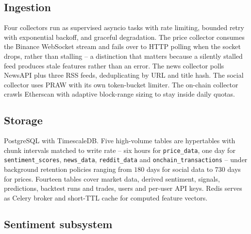 \documentclass[preprint,12pt,authoryear]{elsarticle}
\begin{document}
\subsection{Ingestion}

Four collectors run as supervised asyncio tasks with rate limiting, bounded
retry with exponential backoff, and graceful degradation. The price collector
consumes the Binance WebSocket stream and fails over to HTTP polling when the
socket drops, rather than stalling -- a distinction that matters because a
silently stalled feed produces stale features rather than an error. The news
collector polls NewsAPI plus three RSS feeds, deduplicating by URL and title
hash. The social collector uses PRAW with its own token-bucket limiter. The
on-chain collector crawls Etherscan with adaptive block-range sizing to stay
inside daily quotas.

\subsection{Storage}

PostgreSQL with TimescaleDB. Five high-volume tables are hypertables with chunk
intervals matched to write rate -- six hours for \texttt{price\_data}, one day
for \texttt{sentiment\_scores}, \texttt{news\_data}, \texttt{reddit\_data} and
\texttt{onchain\_transactions} -- under background retention policies ranging
from $180$ days for social data to $730$ days for prices. Fourteen tables cover
market data, derived sentiment, signals, predictions, backtest runs and trades,
users and per-user API keys. Redis serves as Celery broker and short-TTL cache
for computed feature vectors.

\subsection{Sentiment subsystem}
\label{ssec:sentiment}
\end{document}
